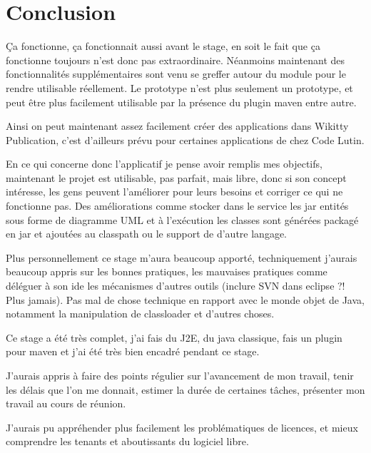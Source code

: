 \section{Conclusion}

Ça fonctionne, ça fonctionnait aussi avant le stage, en soit le fait que ça 
fonctionne toujours n'est donc pas extraordinaire. Néanmoins maintenant des 
fonctionnalités supplémentaires sont venu se greffer autour du module pour le 
rendre utilisable réellement. Le prototype n'est plus seulement un prototype, 
et peut être plus facilement utilisable par la présence du plugin maven entre
autre.

Ainsi on peut maintenant assez facilement créer des applications dans Wikitty
Publication, c'est d'ailleurs prévu pour certaines applications de chez Code
Lutin.

En ce qui concerne donc l'applicatif je pense avoir remplis mes objectifs, 
maintenant le projet est utilisable, pas parfait, mais libre, donc si son concept
intéresse, les gens peuvent l'améliorer pour leurs besoins et corriger ce qui ne
fonctionne pas. Des améliorations comme stocker dans le service les jar
entités sous forme de diagramme UML et à l'exécution les classes sont générées 
packagé en jar et ajoutées au classpath ou le support de d'autre langage.

Plus personnellement ce stage m'aura beaucoup apporté, techniquement j'aurais
beaucoup appris sur les bonnes pratiques, les mauvaises pratiques comme déléguer
à son ide les mécanismes d'autres outils (inclure SVN dans eclipse ?! Plus jamais).
Pas mal de chose technique en rapport avec le monde objet de Java, notamment
la manipulation de classloader et d'autres choses.

Ce stage a été très complet, j'ai fais du J2E, du java classique, fais un plugin
pour maven et j'ai été très bien encadré pendant ce stage.

J'aurais appris à faire des points régulier sur l'avancement de mon travail,
tenir les délais que l'on me donnait, estimer la durée de certaines tâches, 
présenter mon travail au cours de réunion.

J'aurais pu appréhender plus facilement les problématiques de licences, et mieux 
comprendre les tenants et aboutissants du logiciel libre.
